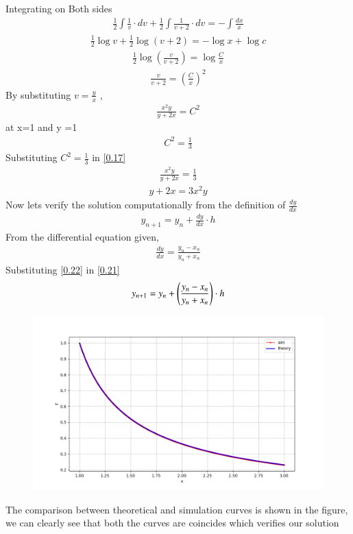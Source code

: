 \documentclass[journal]{IEEEtran}
\begin{document}
Integrating on Both sides
\begin{align}
   \frac{1}{2}\int\frac{1}{v} \cdot dv + \frac{1}{2}\int\frac{1}{v+2}\cdot dv = -\int \frac{dx}{x}
\end{align}
\begin{align}
    \frac{1}{2}\log v + \frac{1}{2}\log (v+2) = - \log{x} + \log c
\end{align}
\begin{align}
    \frac{1}{2} \log (\frac{v}{v+2}) = \log \frac{C}{x}
\end{align}
\begin{align}
    \frac{v}{v+2} = (\frac{C}{x})^2
\end{align}
By substituting $v=\frac{y}{x}$ ,
\begin{align}
    \frac{x^2 y}{y+2x} =  C^2
    \label{0.17}
\end{align}
at x=1 and y =1 
\begin{align}
    C^2 = \frac{1}{3}
\end{align}
Substituting $C^2 = \frac{1}{3}$ in \ref{0.17} 
\begin{align}
    \frac{x^2y}{y+2x} = \frac{1}{3}
\end{align}
\begin{align}
    y+2x = 3x^2y
\end{align}
Now lets verify the solution computationally from the definition of $\frac{dy}{dx}$
\begin{align}
    y_{n+1}= y_{n} + \frac{dy}{dx} \cdot h
    \label{0.21}
\end{align}
From the differential equation given,
\begin{align}
    \frac{dy}{dx} = \frac{y_n - x_n}{y_n + x_n}
    \label{0.22}
\end{align}
Substituting \ref{0.22} in \ref{0.21}
\begin{align}
    y_{n+1} = y_n + \left(\frac{y_n - x_n}{y_n + x_n}\right) \cdot h 
\end{align}
\begin{figure}
    \centering
    \includegraphics[width=\columnwidth]{Figure_1.png}
\end{figure}
The comparison between theoretical and simulation curves is shown in the figure, we can clearly see that both the curves are coincides which verifies our solution
\end{document}
